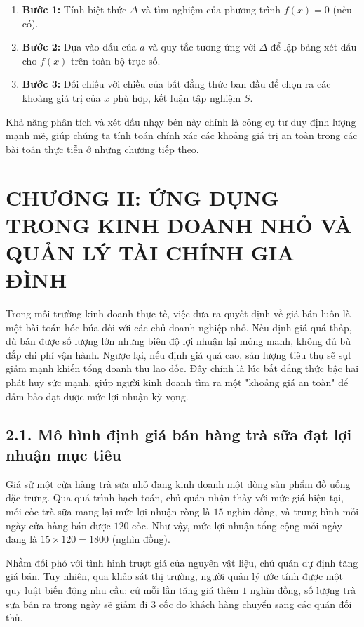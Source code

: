 \documentclass[14pt, a4paper, oneside]{extreport}
\begin{document}
\begin{enumerate}[leftmargin=*]
    \item \textbf{Bước 1:} Tính biệt thức $\Delta$ và tìm nghiệm của phương trình $f(x) = 0$ (nếu có).
    \item \textbf{Bước 2:} Dựa vào dấu của $a$ và quy tắc tương ứng với $\Delta$ để lập bảng xét dấu cho $f(x)$ trên toàn bộ trục số.
    \item \textbf{Bước 3:} Đối chiếu với chiều của bất đẳng thức ban đầu để chọn ra các khoảng giá trị của $x$ phù hợp, kết luận tập nghiệm $S$.
\end{enumerate}

Khả năng phân tích và xét dấu nhạy bén này chính là công cụ tư duy định lượng mạnh mẽ, giúp chúng ta tính toán chính xác các khoảng giá trị an toàn trong các bài toán thực tiễn ở những chương tiếp theo.

\newpage

\section*{\centering CHƯƠNG II: ỨNG DỤNG TRONG KINH DOANH NHỎ VÀ QUẢN LÝ TÀI CHÍNH GIA ĐÌNH}

Trong môi trường kinh doanh thực tế, việc đưa ra quyết định về giá bán luôn là một bài toán hóc búa đối với các chủ doanh nghiệp nhỏ. Nếu định giá quá thấp, dù bán được số lượng lớn nhưng biên độ lợi nhuận lại mỏng manh, không đủ bù đắp chi phí vận hành. Ngược lại, nếu định giá quá cao, sản lượng tiêu thụ sẽ sụt giảm mạnh khiến tổng doanh thu lao dốc. Đây chính là lúc bất đẳng thức bậc hai phát huy sức mạnh, giúp người kinh doanh tìm ra một "khoảng giá an toàn" để đảm bảo đạt được mức lợi nhuận kỳ vọng.

\subsection*{2.1. Mô hình định giá bán hàng trà sữa đạt lợi nhuận mục tiêu}

Giả sử một cửa hàng trà sữa nhỏ đang kinh doanh một dòng sản phẩm đồ uống đặc trưng. Qua quá trình hạch toán, chủ quán nhận thấy với mức giá hiện tại, mỗi cốc trà sữa mang lại mức lợi nhuận ròng là $15$ nghìn đồng, và trung bình mỗi ngày cửa hàng bán được $120$ cốc. Như vậy, mức lợi nhuận tổng cộng mỗi ngày đang là $15 \times 120 = 1800$ (nghìn đồng).

Nhằm đối phó với tình hình trượt giá của nguyên vật liệu, chủ quán dự định tăng giá bán. Tuy nhiên, qua khảo sát thị trường, người quản lý ước tính được một quy luật biến động nhu cầu: cứ mỗi lần tăng giá thêm $1$ nghìn đồng, số lượng trà sữa bán ra trong ngày sẽ giảm đi $3$ cốc do khách hàng chuyển sang các quán đối thủ.
\end{document}
